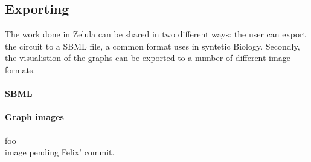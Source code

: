 \subsection{Exporting}
The work done in Zelula can be shared in two different ways: the user can export the circuit to a SBML file, a common format uses in syntetic Biology. Secondly, the visualistion of the graphs can be exported to a number of different image formats.

\paragraph{SBML}

\paragraph{Graph images}
foo \\
image pending Felix' commit.
